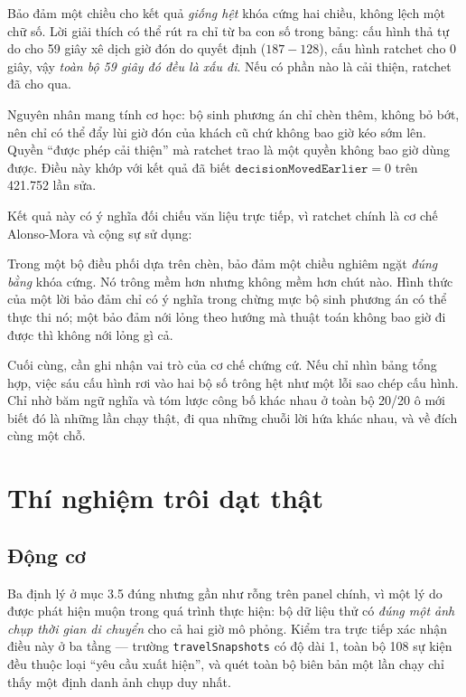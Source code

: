 Bảo đảm một chiều cho kết quả \emph{giống hệt} khóa cứng hai chiều, không lệch một chữ số. Lời
giải thích có thể rút ra chỉ từ ba con số trong bảng: cấu hình thả tự do cho 59 giây xê dịch giờ
đón do quyết định ($187 - 128$), cấu hình ratchet cho 0 giây, vậy \emph{toàn bộ 59 giây đó đều
là xấu đi}. Nếu có phần nào là cải thiện, ratchet đã cho qua.

Nguyên nhân mang tính cơ học: bộ sinh phương án chỉ chèn thêm, không bỏ bớt, nên chỉ có thể đẩy
lùi giờ đón của khách cũ chứ không bao giờ kéo sớm lên. Quyền ``được phép cải thiện'' mà ratchet
trao là một quyền không bao giờ dùng được. Điều này khớp với kết quả đã biết
$\mathtt{decisionMovedEarlier} = 0$ trên 421.752 lần sửa.

Kết quả này có ý nghĩa đối chiếu văn liệu trực tiếp, vì ratchet chính là cơ chế Alonso-Mora và
cộng sự sử dụng:

\begin{khungy}
Trong một bộ điều phối dựa trên chèn, bảo đảm một chiều nghiêm ngặt \emph{đúng bằng} khóa cứng.
Nó trông mềm hơn nhưng không mềm hơn chút nào. Hình thức của một lời bảo đảm chỉ có ý nghĩa
trong chừng mực bộ sinh phương án có thể thực thi nó; một bảo đảm nới lỏng theo hướng mà thuật
toán không bao giờ đi được thì không nới lỏng gì cả.
\end{khungy}

Cuối cùng, cần ghi nhận vai trò của cơ chế chứng cứ. Nếu chỉ nhìn bảng tổng hợp, việc sáu cấu
hình rơi vào hai bộ số trông hệt như một lỗi sao chép cấu hình. Chỉ nhờ băm ngữ nghĩa và tóm
lược công bố khác nhau ở toàn bộ 20/20 ô mới biết đó là những lần chạy thật, đi qua những chuỗi
lời hứa khác nhau, và về đích cùng một chỗ.

\section{Thí nghiệm trôi dạt thật}
\label{muc:troidat}

\subsection{Động cơ}

Ba định lý ở mục 3.5 đúng nhưng gần như rỗng trên panel chính, vì một lý do được phát hiện muộn
trong quá trình thực hiện: bộ dữ liệu thử có \emph{đúng một ảnh chụp thời gian di chuyển} cho cả
hai giờ mô phỏng. Kiểm tra trực tiếp xác nhận điều này ở ba tầng --- trường
\texttt{travelSnapshots} có độ dài 1, toàn bộ 108 sự kiện đều thuộc loại ``yêu cầu xuất hiện'',
và quét toàn bộ biên bản một lần chạy chỉ thấy một định danh ảnh chụp duy nhất.

